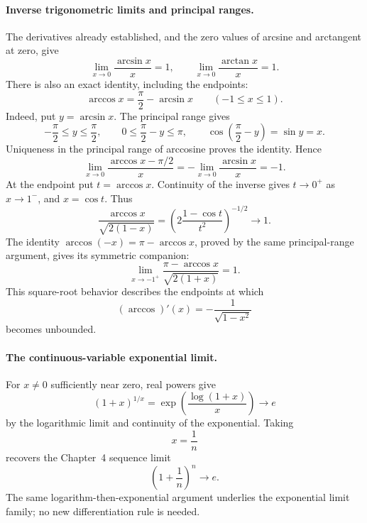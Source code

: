 \paragraph{Inverse trigonometric limits and principal ranges.}
The derivatives already established, and the zero values of arcsine and
arctangent at zero, give
\[
\lim_{x\to0}\frac{\arcsin x}{x}=1,
\qquad \lim_{x\to0}\frac{\arctan x}{x}=1.
\]
There is also an exact identity, including the endpoints:
\[
\arccos x=\frac\pi2-\arcsin x\qquad(-1\leq x\leq1).
\]
Indeed, put $y=\arcsin x$. The principal range gives
\[
-\frac\pi2\leq y\leq\frac\pi2,
\qquad 0\leq\frac\pi2-y\leq\pi,
\qquad \cos\left(\frac\pi2-y\right)=\sin y=x.
\]
Uniqueness in the principal range of arccosine proves the identity. Hence
\[
\lim_{x\to0}\frac{\arccos x-\pi/2}{x}
=-\lim_{x\to0}\frac{\arcsin x}{x}=-1.
\]
At the endpoint put $t=\arccos x$. Continuity of the inverse gives
$t\to0^+$ as $x\to1^-$, and $x=\cos t$. Thus
\[
\frac{\arccos x}{\sqrt{2(1-x)}}
=\left(2\frac{1-\cos t}{t^2}\right)^{-1/2}\longrightarrow1.
\]
The identity $\arccos(-x)=\pi-\arccos x$, proved by the same principal-range
argument, gives its symmetric companion:
\[
\lim_{x\to-1^+}\frac{\pi-\arccos x}{\sqrt{2(1+x)}}=1.
\]
This square-root behavior describes the endpoints at which
\[
(\arccos)'(x)=-\frac1{\sqrt{1-x^2}}
\]
becomes unbounded.

\paragraph{The continuous-variable exponential limit.}
For $x\ne0$ sufficiently near zero, real powers give
\[
(1+x)^{1/x}=\exp\left(\frac{\log(1+x)}x\right)\longrightarrow e
\]
by the logarithmic limit and continuity of the exponential. Taking
\[
x=\frac1n
\]
recovers the Chapter~4 sequence limit
\[
\left(1+\frac1n\right)^n\longrightarrow e.
\]
The same logarithm-then-exponential argument underlies the exponential
limit family; no new differentiation rule is needed.

